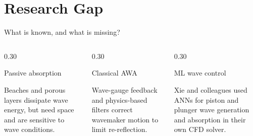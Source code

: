 \documentclass[aspectratio=43,11pt]{beamer}
\begin{document}
\section{Research Gap}

\begin{frame}[t]{What is known, and what is missing?}

\begin{columns}[T,onlytextwidth]

  \begin{column}{0.30\textwidth}
    \begin{block}{Passive absorption}
      \begin{minipage}[t][2.18cm][t]{\linewidth}
        \raggedright\footnotesize
        Beaches and porous layers dissipate wave energy,
        but need space and are sensitive to wave conditions.
      \end{minipage}
    \end{block}
  \end{column}

  \hfill

  \begin{column}{0.30\textwidth}
    \begin{block}{Classical AWA}
      \begin{minipage}[t][2.18cm][t]{\linewidth}
        \raggedright\footnotesize
        Wave-gauge feedback and physics-based filters
        correct wavemaker motion to limit re-reflection.
      \end{minipage}
    \end{block}
  \end{column}

  \hfill

  \begin{column}{0.30\textwidth}
    \begin{block}{ML wave control}
      \begin{minipage}[t][2.18cm][t]{\linewidth}
        \raggedright\footnotesize
        Xie and colleagues used ANNs for piston
        and plunger wave generation and absorption
        in their own CFD solver.
      \end{minipage}
    \end{block}
  \end{column}

\end{columns}


\end{frame}
\end{document}
